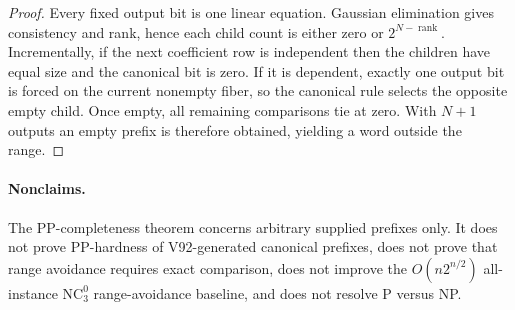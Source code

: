 \documentclass[11pt]{article}
\begin{document}
\begin{proof}
Every fixed output bit is one linear equation.  Gaussian elimination gives
consistency and rank, hence each child count is either zero or
$2^{N-\operatorname{rank}}$.  Incrementally, if the next coefficient row is
independent then the children have equal size and the canonical bit is zero.
If it is dependent, exactly one output bit is forced on the current nonempty
fiber, so the canonical rule selects the opposite empty child.  Once empty,
all remaining comparisons tie at zero.  With $N+1$ outputs an empty prefix is
therefore obtained, yielding a word outside the range.
\end{proof}

\paragraph{Nonclaims.}
The PP-completeness theorem concerns arbitrary supplied prefixes only.  It does
not prove PP-hardness of V92-generated canonical prefixes, does not prove that
range avoidance requires exact comparison, does not improve the
$O(n2^{n/2})$ all-instance $\mathrm{NC}^0_3$ range-avoidance baseline, and does
not resolve P versus NP.
\end{document}
